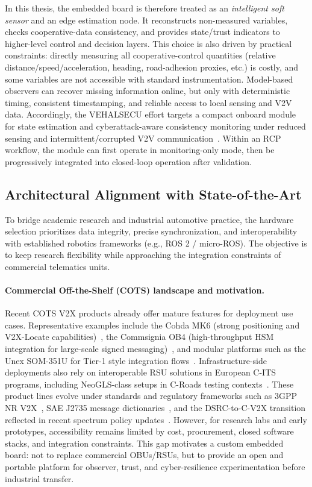 In this thesis, the embedded board is therefore treated as an \emph{intelligent soft sensor} and an edge estimation node.
It reconstructs non-measured variables, checks cooperative-data consistency, and provides state/trust indicators to higher-level control and decision layers.
This choice is also driven by practical constraints: directly measuring all cooperative-control quantities (relative distance/speed/acceleration, heading, road-adhesion proxies, etc.) is costly, and some variables are not accessible with standard instrumentation.
Model-based observers can recover missing information online, but only with deterministic timing, consistent timestamping, and reliable access to local sensing and V2V data.
Accordingly, the VEHALSECU effort targets a compact onboard module for state estimation and cyberattack-aware consistency monitoring under reduced sensing and intermittent/corrupted V2V communication~\cite{chaix2026vehalsecu}.
Within an RCP workflow, the module can first operate in monitoring-only mode, then be progressively integrated into closed-loop operation after validation.

\subsection{Architectural Alignment with State-of-the-Art}\label{chp6_subsec_sota_alignment}
To bridge academic research and industrial automotive practice, the hardware selection prioritizes data integrity, precise synchronization, and interoperability with established robotics frameworks (e.g., ROS 2 / micro-ROS).
The objective is to keep research flexibility while approaching the integration constraints of commercial telematics units.

\paragraph{Commercial Off-the-Shelf (COTS) landscape and motivation.}

Recent COTS  V2X products already offer mature features for deployment use cases.
Representative examples include the Cohda MK6 (strong positioning and V2X-Locate capabilities)~\cite{cohda2025mk6}, the Commsignia OB4 (high-throughput HSM integration for large-scale signed messaging)~\cite{commsignia2025ob4}, and modular platforms such as the Unex SOM-351U for Tier-1 style integration flows~\cite{unex2024som}.
Infrastructure-side deployments also rely on interoperable RSU solutions in European C-ITS programs, including NeoGLS-class setups in C-Roads testing contexts~\cite{croads2023interop}.
These product lines evolve under standards and regulatory frameworks such as 3GPP NR V2X~\cite{3gpp_rel16_v2x}, SAE J2735 message dictionaries~\cite{saej2735_2024}, and the DSRC-to-C-V2X transition reflected in recent spectrum policy updates~\cite{fcc2024v2x}.
However, for research labs and early prototypes, accessibility remains limited by cost, procurement, closed software stacks, and integration constraints.
This gap motivates a custom embedded board: not to replace commercial OBUs/RSUs, but to provide an open and portable platform for observer, trust, and cyber-resilience experimentation before industrial transfer.

